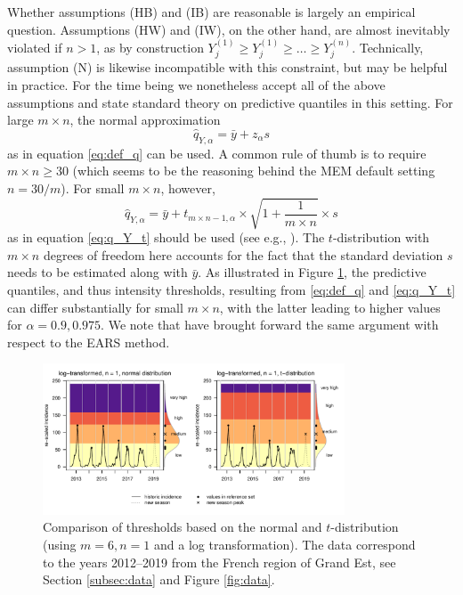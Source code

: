 \documentclass[12pt]{article}
\newcommand{\sd}{s}
\begin{document}
Whether assumptions (HB) and (IB) are reasonable is largely an empirical question. Assumptions (HW) and (IW), on the other hand, are almost inevitably violated if $n > 1$, as by construction $Y_j^{(1)} \geq Y_j^{(1)} \geq \dots \geq Y_j^{(n)}$. Technically, assumption (N) is likewise incompatible with this constraint, but may be helpful in practice.  For the time being we nonetheless accept all of the above assumptions and state standard theory on predictive quantiles in this setting. For large $m\times n$, the normal approximation
$$
\hat{q}_{Y, \alpha} = \bar{y} + z_\alpha \sd
$$
as in equation \eqref{eq:def_q} can be used. A common rule of thumb is to require $m \times n \geq 30$ (which seems to be the reasoning behind the MEM default setting $n = 30/m$). For small $m \times n$, however,
\begin{equation*}
\hat{q}_{Y, \alpha} = \bar{y} + t_{m\times n - 1, \alpha} \times \sqrt{1 + \frac{1}{m\times n}} \times s
\end{equation*}
as in equation \eqref{eq:q_Y_t} should be used (see e.g., \citealt{Preston2000}). The $t$-distribution with $m \times n$ degrees of freedom here accounts for the fact that the standard deviation $s$ needs to be estimated along with $\bar{y}$. As illustrated in Figure \ref{fig:illustration_t}, the predictive quantiles, and thus intensity thresholds, resulting from \eqref{eq:def_q} and \eqref{eq:q_Y_t} can differ substantially for small $m \times n$, with the latter leading to higher values for $\alpha = 0.9, 0.975$. We note that \cite{Allevius2020} have brought forward the same argument with respect to the EARS method.


\begin{figure}
\begin{center}
\includegraphics[width = 0.8\textwidth, trim={0 5mm 0 0},clip]{figure/illustration_t_normal.pdf}\vspace{-5mm}
\end{center}
\caption{Comparison of thresholds based on the normal and $t$-distribution (using $m = 6, n = 1$ and a log transformation). The data correspond to the years 2012--2019 from the French region of Grand Est, see Section \ref{subsec:data} and Figure \ref{fig:data}.}
\label{fig:illustration_t}
\end{figure}
\end{document}
